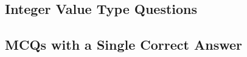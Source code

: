 \subsection*{Integer Value Type Questions}
\begin{enumerate}[label=\thechapter.\arabic*,ref=\thechapter.\theenumi]




\end{enumerate}
\subsection*{MCQs with a Single Correct Answer}
\begin{enumerate}[label=\thechapter.\arabic*,ref=\thechapter.\theenumi]




\end{enumerate}
